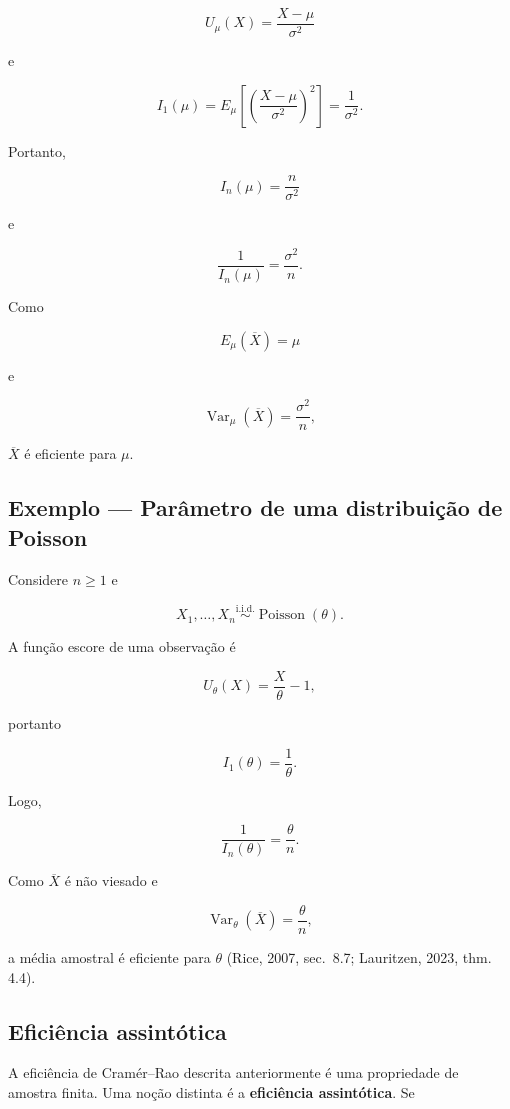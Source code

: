\documentclass[
  letterpaper,
  DIV=11,
  numbers=noendperiod]{scrreprt}
\begin{document}
\[U_\mu(X)
=
\frac{X-\mu}{\sigma^2}\]

e

\[I_1(\mu)
=
E_\mu\left[
\left(\frac{X-\mu}{\sigma^2}\right)^2
\right]
=
\frac{1}{\sigma^2}.\]

Portanto,

\[I_n(\mu)
=
\frac{n}{\sigma^2}\]

e

\[\frac{1}{I_n(\mu)}
=
\frac{\sigma^2}{n}.\]

Como

\[E_\mu(\overline{X})=\mu\]

e

\[\operatorname{Var}_\mu(\overline{X})
=
\frac{\sigma^2}{n},\]

\(\overline{X}\) é eficiente para \(\mu\).

\subsection*{Exemplo --- Parâmetro de uma distribuição de
Poisson}\label{exemplo-paruxe2metro-de-uma-distribuiuxe7uxe3o-de-poisson}

Considere \(n\geq1\) e

\[X_1,\ldots,X_n
\overset{\mathrm{i.i.d.}}{\sim}
\operatorname{Poisson}(\theta).\]

A função escore de uma observação é

\[U_\theta(X)
=
\frac{X}{\theta}-1,\]

portanto

\[I_1(\theta)
=
\frac{1}{\theta}.\]

Logo,

\[\frac{1}{I_n(\theta)}
=
\frac{\theta}{n}.\]

Como \(\overline{X}\) é não viesado e

\[\operatorname{Var}_\theta(\overline{X})
=
\frac{\theta}{n},\]

a média amostral é eficiente para \(\theta\) (Rice, 2007, sec.~8.7;
Lauritzen, 2023, thm. 4.4).

\subsection*{Eficiência assintótica}\label{eficiuxeancia-assintuxf3tica}

A eficiência de Cramér--Rao descrita anteriormente é uma propriedade de
amostra finita. Uma noção distinta é a \textbf{eficiência assintótica}.
Se
\end{document}
